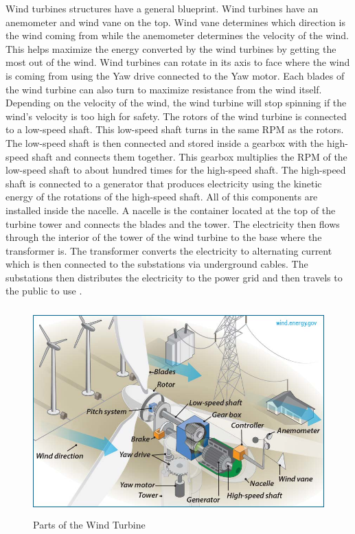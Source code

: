Wind turbines structures have a general blueprint. Wind turbines have an anemometer and wind vane on the top. Wind vane determines which direction is the wind coming from while the anemometer determines the velocity of the wind. This helps maximize the energy converted by the wind turbines by getting the most out of the wind. Wind turbines can rotate in its axis to face where the wind is coming from using the Yaw drive connected to the Yaw motor. Each blades of the wind turbine can also turn to maximize resistance from the wind itself. Depending on the velocity of the wind, the wind turbine will stop spinning if the wind's velocity is too high for safety. The rotors of the wind turbine is connected to a low-speed shaft. This low-speed shaft turns in the same RPM as the rotors. The low-speed shaft is then connected and stored inside a gearbox with the high-speed shaft and connects them together. This gearbox multiplies the RPM of the low-speed shaft to about hundred times for the high-speed shaft. The high-speed shaft is connected to a generator that produces electricity using the kinetic energy of the rotations of the high-speed shaft. All of this components are installed inside the nacelle. A nacelle is the container located at the top of the turbine tower and connects the blades and the tower. The electricity then flows through the interior of the tower of the wind turbine to the base where the transformer is. The transformer converts the electricity to alternating current which is then connected to the substations via underground cables. The substations then distributes the electricity to the power grid and then travels to the public to use \cite{windturbine3}.
\begin{figure}
            \centering
            \includegraphics[width=130mm, height = 80mm]{Figures/windMotor.png}
            \caption{Parts of the Wind Turbine \cite{windPrt}}
            \label{fig:my_label}
\end{figure}